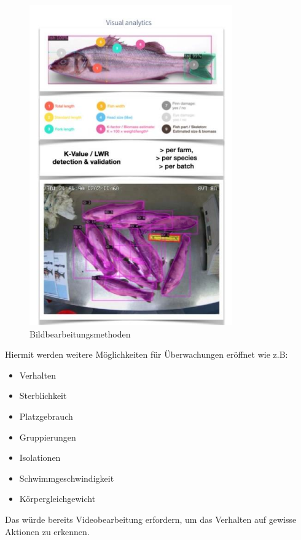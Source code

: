 \documentclass[../main.tex]{subfiles}
\begin{document}
	\begin{figure}[H]
		\centering
		\includegraphics{../images/Imageprocessing} 
		\caption{Bildbearbeitungsmethoden}
		\label{fig:Imageprocessing}
	\end{figure}
	
	\par \noindent
	Hiermit werden weitere Möglichkeiten für Überwachungen eröffnet wie z.B:
	
	\begin{itemize}
	 	\item Verhalten 
	 	\item Sterblichkeit
	 	\item Platzgebrauch
	 	\item Gruppierungen
	 	\item Isolationen
	 	\item Schwimmgeschwindigkeit
	 	\item Körpergleichgewicht
	\end{itemize}
\noindent
	Das würde bereits Videobearbeitung erfordern, um das Verhalten auf gewisse Aktionen zu erkennen. 

	
\end{document}
